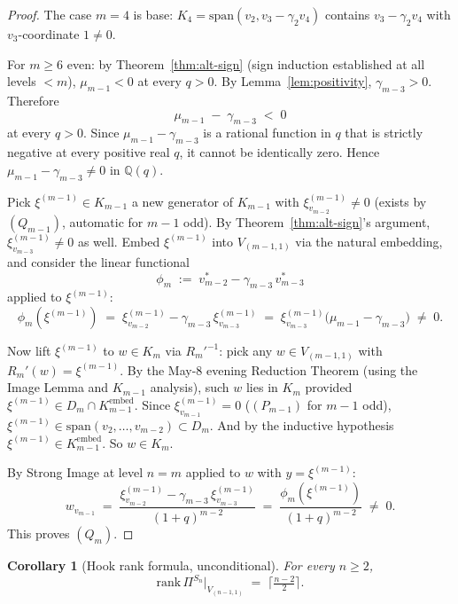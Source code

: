 \documentclass[11pt]{article}
\newtheorem{corollary}[theorem]{Corollary}
\theoremstyle{definition}
\begin{document}
\begin{proof}
The case $m = 4$ is base: $K_4 = \mathrm{span}(v_2, v_3 - \gamma_2 v_4)$
contains $v_3 - \gamma_2 v_4$ with $v_3$-coordinate $1 \neq 0$.

For $m \ge 6$ even: by Theorem~\ref{thm:alt-sign} (sign induction
established at all levels $< m$), $\mu_{m-1} < 0$ at every $q > 0$.
By Lemma~\ref{lem:positivity}, $\gamma_{m-3} > 0$.  Therefore
\[
   \mu_{m-1} \;-\; \gamma_{m-3} \;<\; 0
\]
at every $q > 0$.  Since $\mu_{m-1} - \gamma_{m-3}$ is a rational
function in $q$ that is strictly negative at every positive real $q$,
it cannot be identically zero.  Hence $\mu_{m-1} - \gamma_{m-3} \neq 0$
in $\mathbb{Q}(q)$.

Pick $\xi^{(m-1)} \in K_{m-1}$ a new generator of $K_{m-1}$ with
$\xi^{(m-1)}_{v_{m-2}} \neq 0$ (exists by $(Q_{m-1})$, automatic for
$m-1$ odd).  By Theorem~\ref{thm:alt-sign}'s argument,
$\xi^{(m-1)}_{v_{m-3}} \neq 0$ as well.  Embed $\xi^{(m-1)}$ into
$V_{(m-1,1)}$ via the natural embedding, and consider the linear
functional
\[
   \phi_m \;:=\; v_{m-2}^* - \gamma_{m-3}\, v_{m-3}^*
\]
applied to $\xi^{(m-1)}$:
\[
   \phi_m(\xi^{(m-1)}) \;=\; \xi^{(m-1)}_{v_{m-2}} - \gamma_{m-3}\, \xi^{(m-1)}_{v_{m-3}}
   \;=\; \xi^{(m-1)}_{v_{m-3}}\bigl(\mu_{m-1} - \gamma_{m-3}\bigr) \;\neq\; 0.
\]

Now lift $\xi^{(m-1)}$ to $w \in K_m$ via $R_m'^{-1}$: pick any
$w \in V_{(m-1,1)}$ with $R_m'(w) = \xi^{(m-1)}$.  By the May-8
evening Reduction Theorem (using the Image Lemma and $K_{m-1}$
analysis), such $w$ lies in $K_m$ provided $\xi^{(m-1)} \in
D_m \cap K_{m-1}^{\mathrm{embed}}$.  Since $\xi^{(m-1)}_{v_{m-1}} = 0$
($(P_{m-1})$ for $m-1$ odd), $\xi^{(m-1)} \in
\mathrm{span}(v_2,\ldots,v_{m-2}) \subset D_m$.  And by the
inductive hypothesis $\xi^{(m-1)} \in K_{m-1}^{\mathrm{embed}}$.  So
$w \in K_m$.

By Strong Image at level $n = m$ applied to $w$ with $y = \xi^{(m-1)}$:
\[
   w_{v_{m-1}} \;=\; \frac{\xi^{(m-1)}_{v_{m-2}} - \gamma_{m-3}\,\xi^{(m-1)}_{v_{m-3}}}{(1+q)^{m-2}}
   \;=\; \frac{\phi_m(\xi^{(m-1)})}{(1+q)^{m-2}} \;\neq\; 0.
\]
This proves $(Q_m)$.
\end{proof}

\begin{corollary}[Hook rank formula, unconditional]\label{cor:hook-rank}
For every $n \ge 2$,
\[
   \mathrm{rank}\,\Pi^{S_n}|_{V_{(n-1,1)}} \;=\; \big\lceil \tfrac{n-2}{2} \big\rceil.
\]
\end{corollary}
\end{document}
